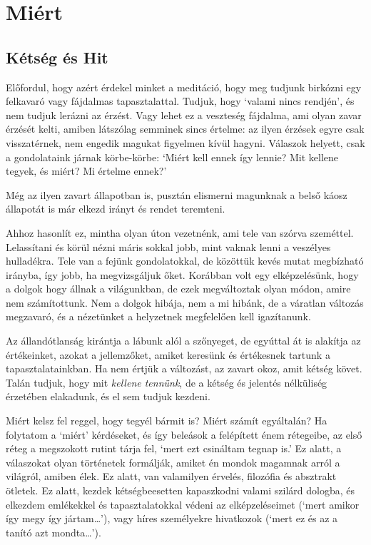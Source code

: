 \chapter{Miért}

\section{Kétség és Hit}


\noindent Előfordul, hogy azért érdekel minket a meditáció, hogy meg
tudjunk birkózni egy felkavaró vagy fájdalmas tapasztalattal. Tudjuk,
hogy `valami nincs rendjén', és nem tudjuk lerázni az érzést. Vagy lehet
ez a veszteség fájdalma, ami olyan zavar érzését kelti, amiben látszólag
semminek sincs értelme: az ilyen érzések egyre csak visszatérnek, nem
engedik magukat figyelmen kívül hagyni. Válaszok helyett, csak a
gondolataink járnak körbe-körbe: `Miért kell ennek így lennie? Mit
kellene tegyek, és miért? Mi értelme ennek?'

Még az ilyen zavart állapotban is, pusztán elismerni magunknak a belső
káosz állapotát is már elkezd irányt és rendet teremteni.

Ahhoz hasonlít ez, mintha olyan úton vezetnénk, ami tele van szórva
szeméttel. Lelassítani és körül nézni máris sokkal jobb, mint vaknak
lenni a veszélyes hulladékra. Tele van a fejünk gondolatokkal, de
közöttük kevés mutat megbízható irányba, így jobb, ha megvizsgáljuk
őket. Korábban volt egy elképzelésünk, hogy a dolgok hogy állnak a
világunkban, de ezek megváltoztak olyan módon, amire nem számítottunk.
Nem a dolgok hibája, nem a mi hibánk, de a váratlan változás megzavaró,
és a nézetünket a helyzetnek megfelelően kell igazítanunk.

Az állandótlanság kirántja a lábunk alól a szőnyeget, de egyúttal át is
alakítja az értékeinket, azokat a jellemzőket, amiket keresünk és
értékesnek tartunk a tapasztalatainkban. Ha nem értjük a változást, az
zavart okoz, amit kétség követ. Talán tudjuk, hogy mit \emph{kellene
tennünk}, de a kétség és jelentés nélküliség érzetében elakadunk, és el
sem tudjuk kezdeni.


Miért kelsz fel reggel, hogy tegyél bármit is? Miért számít egyáltalán?
Ha folytatom a `miért' kérdéseket, és így beleások a felépített énem
rétegeibe, az első réteg a megszokott rutint tárja fel, `mert ezt
csináltam tegnap is.' Ez alatt, a válaszokat olyan történetek formálják,
amiket én mondok magamnak arról a világról, amiben élek. Ez alatt, van
valamilyen érvelés, filozófia és absztrakt ötletek. Ez alatt, kezdek
kétségbeesetten kapaszkodni valami szilárd dologba, és elkezdem
emlékekkel és tapasztalatokkal védeni az elképzeléseimet (`mert amikor
így megy így jártam\ldots{}'), vagy híres személyekre hivatkozok (`mert
ez és az a tanító azt mondta\ldots{}').

